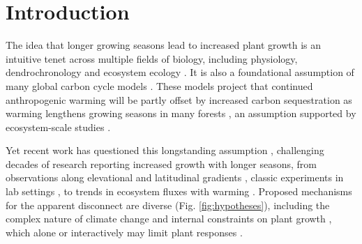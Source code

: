 \documentclass[11pt]{article}
\newcommand{\R}[1]{\label{#1}\linelabel{#1}}
\begin{document}
\section*{Introduction} %

The idea that longer growing seasons lead to increased plant growth is an intuitive tenet across multiple fields of biology, including physiology, dendrochronology and ecosystem ecology \citep{nobel1983biophysical,frank2022dendrochronology}. It is also a foundational assumption of many global carbon cycle models \citep[e.g.][]{ito2020global,friedlingstein2022global}. These models project that continued anthropogenic warming will be partly offset by increased carbon sequestration as warming lengthens growing seasons in many forests \citep{friedlingstein2022global}, an assumption supported by ecosystem-scale studies \citep{chen1999effects,keenan2014net,finzi2020}. 

Yet recent work has questioned this longstanding assumption \citep[e.g.][]{dow2022warm,green2022limits,silvestro2023longer}, challenging decades of research reporting increased growth with longer seasons, from observations along elevational and latitudinal gradients \citep[][]{myneni1997increased,berdanier2011growing,king2013tree,cuapio2022there}, classic experiments in lab settings \citep{went1957experimental}, to trends in ecosystem fluxes with warming \citep{chen1999effects,keenan2014net,finzi2020}. Proposed mechanisms for the apparent disconnect are diverse (Fig. \ref{fig:hypotheses}), including the complex nature of climate change \citep[e.g. drought or heat stress,][]{dow2022warm} and internal constraints on plant growth \citep{zohner2023effect}, which alone or interactively may limit plant responses \R{forbigKref1}\citep{korner2015paradigm}. %
\end{document}
